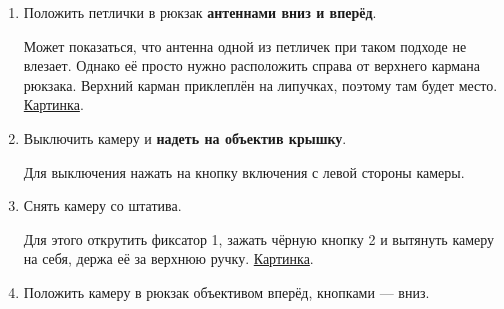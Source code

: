 \begin{enumerate}
  \item Положить петлички в рюкзак \textbf{антеннами вниз и вперёд}.
        \par Может показаться, что антенна одной из петличек при таком подходе не влезает. Однако её просто нужно расположить справа от верхнего кармана рюкзака. Верхний карман приклеплён на липучках, поэтому там будет место. \hyperref[fig:camera-in-bag]{Картинка}.

  \item Выключить камеру и \textbf{надеть на объектив крышку}.
        \par Для выключения нажать на кнопку включения с левой стороны камеры.

  \item Снять камеру со штатива.
        \par Для этого открутить фиксатор 1, зажать чёрную кнопку 2 и вытянуть камеру на себя, держа её за верхнюю ручку. \hyperref[fig:retainer]{Картинка}.

  \item Положить камеру в рюкзак объективом вперёд, кнопками --- вниз.


\end{enumerate}
